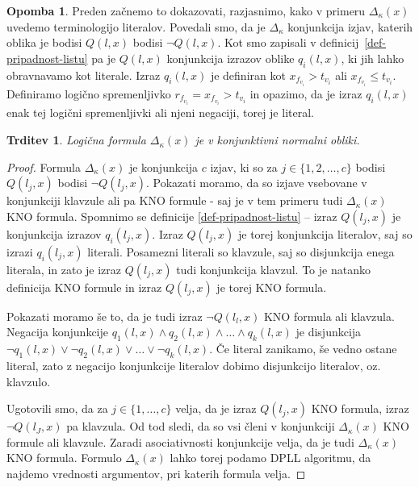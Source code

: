 \documentclass[12pt,a4paper,twoside]{article}
\theoremstyle{definition} %
\newtheorem{opomba}[definicija]{Opomba}
\theoremstyle{plain} %
\newtheorem{trditev}[definicija]{Trditev}
\numberwithin{equation}{section}  %
\begin{document}
\begin{opomba}
\label{opomba:literal}
	Preden začnemo to dokazovati, razjasnimo, kako v primeru $\Delta_{\kappa}(x)$ uvedemo terminologijo literalov.
	Povedali smo, da je $\Delta_{\kappa}$ konjunkcija izjav, katerih oblika je bodisi $Q(l,x)$ bodisi $\lnot Q(l,x)$.
	Kot smo zapisali v definicij~\ref{def-pripadnost-listu} pa je $Q(l,x)$ konjunkcija izrazov oblike $q_i(l,x)$, ki jih lahko obravnavamo kot literale.
	Izraz $q_i(l,x)$ je definiran kot $x_{f_{v_i}} > t_{v_i}$ ali $x_{f_{v_i}} \leq t_{v_i}$.
	Definiramo logično spremenljivko $r_{f_{v_i}} = x_{f_{v_i}} > t_{v_i}$ in opazimo, 
	da je izraz $q_i(l,x)$ enak tej logični spremenljivki ali njeni negaciji, torej je literal.
\end{opomba}

\begin{trditev}
	Logična formula $\Delta_{\kappa}(x)$ je v konjunktivni normalni obliki.
\end{trditev}

\begin{proof}
	Formula $\Delta_{\kappa}(x)$ je konjunkcija $c$ izjav, ki so za $j \in \{1,2,\ldots,c\}$ bodisi $Q(l_j,x)$ bodisi $\lnot Q(l_j,x)$.
	Pokazati moramo, da so izjave vsebovane v konjunkciji klavzule ali pa KNO formule - saj je v tem primeru tudi $\Delta_{\kappa}(x)$ KNO formula.
	Spomnimo se definicije \ref{def-pripadnost-listu} -- izraz $Q(l_j,x)$ je konjunkcija izrazov $q_i(l_j,x)$.
	Izraz $Q(l_j,x)$ je torej konjunkcija literalov, saj so izrazi $q_i(l_j,x)$ literali.
	Posamezni literali so klavzule, saj so disjunkcija enega literala, in zato je izraz $Q(l_j,x)$ tudi konjunkcija klavzul.
	To je natanko definicija KNO formule in izraz $Q(l_j,x)$ je torej KNO formula.

	Pokazati moramo še to, da je tudi izraz $\lnot Q(l_l,x)$ KNO formula ali klavzula.
	Negacija konjunkcije $q_1(l,x) \land q_2(l,x) \land \ldots \land q_k(l,x)$ je disjunkcija $\lnot q_1(l,x) \lor \lnot q_2(l,x) \lor \ldots \lor \lnot q_k(l,x)$.
	Če literal zanikamo, še vedno ostane literal, zato z negacijo konjunkcije literalov dobimo disjunkcijo literalov, oz. klavzulo.

	Ugotovili smo, da za $j \in \{1,\ldots,c\}$ velja, da je izraz $Q(l_j,x)$ KNO formula, izraz $\lnot Q(l_J,x)$ pa klavzula.
	Od tod sledi, da so vsi členi v konjunkciji $\Delta_{\kappa}(x)$ KNO formule ali klavzule.
	Zaradi asociativnosti konjunkcije velja, da je tudi $\Delta_{\kappa}(x)$ KNO formula.
	Formulo $\Delta_{\kappa}(x)$ lahko torej podamo DPLL algoritmu, da najdemo vrednosti argumentov, pri katerih formula velja.
\end{proof}
\end{document}
